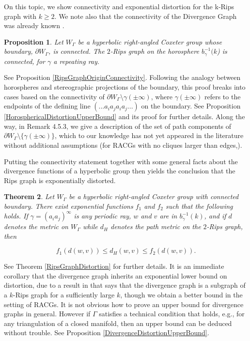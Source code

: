 \documentclass{amsart}
\newtheorem{theorem}{Theorem}[subsection]
\newtheorem{proposition}[theorem]{Proposition}
\theoremstyle{definition}
\theoremstyle{remark}
\begin{document}
	On this topic, we show connectivity and exponential distortion for the k-Rips graph with $k\ge 2$. We note also that the connectivity of the Divergence Graph was already known \cite{CGSR}.
	
	\begin{proposition}
		
		Let $W_\Gamma$ be a hyperbolic right-angled Coxeter group whose boundary, $\partial W_\Gamma$, is connected. The $2$-Rips graph on the horosphere $b_\gamma^{-1}(k$) is connected, for $\gamma$ a repeating ray.
		
	\end{proposition}
	
	See Proposition \ref{RipsGraphOriginConnectivity}. Following the analogy between horospheres and stereographic projections of the boundary, this proof breaks into cases based on the connectivity of \newline $\partial W_\Gamma\setminus \gamma(\pm\infty)$, where $\gamma(\pm\infty)$ refers to the endpoints of the defining line $(...a_ia_ja_ia_j...)$ on the boundary. See Proposition \ref{HorosphericalDistortionUpperBound} and its proof for further details. Along the way, in Remark 4.5.3, we give a description of the set of path components of $\partial W_\Gamma\setminus\{\gamma(\pm\infty)\}$, which to our knowledge has not yet appeared in the literature without additional assumptions (for RACGs with no cliques larger than edges,\cite{DaniThomas,ThetaGraphs,Edletzberger}).
	
	Putting the connectivity statement together with some general facts about the divergence functions of a hyperbolic group then yields the conclusion that the Rips graph is exponentially distorted.
	
	\begin{theorem}
		
		Let $W_\Gamma$ be a hyperbolic right-angled Coxeter group with connected boundary. There exist exponential functions $f_1$ and $f_2$ such that the following holds. If $\gamma=(a_ia_j)^\infty$ is any periodic ray, $w$ and $v$ are in $b_\gamma^{-1}(k)$, and if $d$ denotes the metric on $W_\Gamma$ while $d_H$ denotes the path metric on the $2$-Rips graph, then 
		
		$$ f_1(d(w, v))\le d_H(w, v)\le f_2(d(w, v)).$$
	\end{theorem} 
	
	See Theorem \ref{RipsGraphDistortion} for further details. It is an immediate corollary that the divergence graph inherits an exponential lower bound on distortion, due to a result in \cite{CGSR} that says that the divergence graph is a subgraph of a $k$-Rips graph for a sufficiently large $k$, though we obtain a better bound in the setting of RACGs. It is not obvious how to prove an upper bound for divergence graphs in general. However if $\Gamma$ satisfies a technical condition that holds, e.g., for any triangulation of a closed manifold, then an upper bound can be deduced without trouble. See Proposition \ref{DivergenceDistortionUpperBound}.
	
\end{document}
